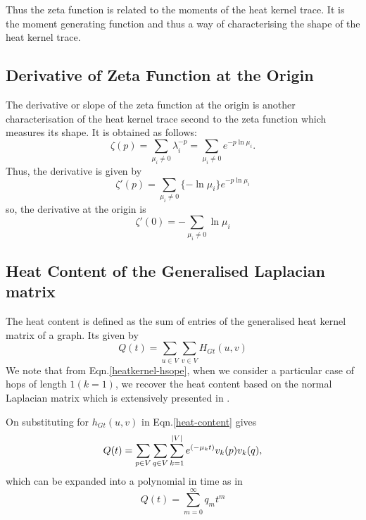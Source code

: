 \documentclass[10pt,a4paper]{article}
\begin{document}
    Thus the zeta function is related to the moments of the heat kernel trace. It is the moment generating function and thus a way of characterising the shape of the heat kernel trace.
    
      \subsection{Derivative of Zeta Function at the Origin}
    
    The derivative or slope of the zeta function at the origin is another characterisation of the heat kernel trace second to the zeta function which measures its shape. It is obtained as follows:
  	\begin{equation}
  	\zeta(p) = \sum_{\mu_i \neq 0} \lambda_{i} ^{-p} = \sum_{\mu_i \neq 0} e^{-p \ln \mu_i}.
  	\end{equation}
  	Thus, the derivative is given by
  	\begin{equation}
  	\zeta'(p) = \sum_{\mu_i \neq 0} \{-\ln \mu_i\}
  	e^{-p \ln \mu_i}
  	\end{equation}
  	so, the derivative at the origin is 
    \begin{equation}
    \zeta'(0) = -\sum_{\mu_i \neq 0}\ln \mu_i
    \end{equation}
    
    \subsection{Heat Content of the Generalised Laplacian matrix}
    
    The heat content is defined as the sum of entries of the generalised heat kernel matrix of a graph. Its given by
    \begin{equation}
    Q(t) = \sum_{u \in V} \sum_{v \in V} H_{Gt}(u,v)
    \label{heat-content}
    \end{equation}
    We note that from Eqn.\ref{heatkernel-hsope}, when we consider a particular case of hops of length $1 (k=1)$, we recover the heat content based on the normal Laplacian matrix which is extensively presented in \citep{xiao2009graph}.
    
    On substituting for $h_{Gt}(u,v)$ in Eqn.\ref{heat-content} gives
    \begin{equation}
    Q(t) = \sum_{p \in V} \sum_{q \in V} \sum_{k=1}^{\arrowvert V\arrowvert} e^{(-\mu_{k} t)} v_{k}(p) v_{k}(q),
    \end{equation}
    which can be expanded into a polynomial in time as in \citep{mcdonald2002diffusions}
    \begin{equation}
    Q(t) = \sum_{m=0}^{\infty} q_m t^m
    \end{equation}
    
\end{document}
